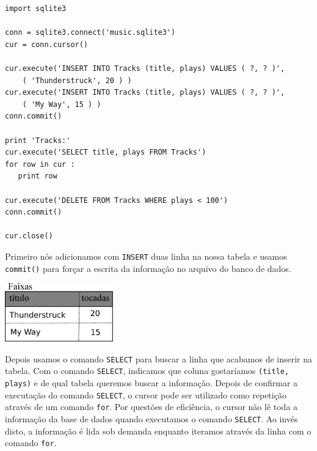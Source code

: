 \beforeverb
\begin{verbatim}
import sqlite3

conn = sqlite3.connect('music.sqlite3')
cur = conn.cursor()

cur.execute('INSERT INTO Tracks (title, plays) VALUES ( ?, ? )', 
    ( 'Thunderstruck', 20 ) )
cur.execute('INSERT INTO Tracks (title, plays) VALUES ( ?, ? )', 
    ( 'My Way', 15 ) )
conn.commit()

print 'Tracks:'
cur.execute('SELECT title, plays FROM Tracks')
for row in cur :
   print row

cur.execute('DELETE FROM Tracks WHERE plays < 100')
conn.commit()

cur.close()
\end{verbatim}
\afterverb
%

Primeiro nós adicionamos com {\tt INSERT} duas linha na nossa tabela e
usamos {\tt commit()} para forçar a escrita da informação no arquivo do banco
de dados.

\beforefig
\centerline{\includegraphics[height=1.00in]{figs2/tracks.eps}}
\afterfig


Depois usamos o comando {\tt SELECT} para buscar a linha que acabamos de
inserir na tabela. Com o comando {\tt SELECT}, indicamos que coluna gostaríamos
{\tt (title, plays)} e de qual tabela queremos buscar a informação. Depois
de confirmar a executação do comando {\tt SELECT}, o cursor pode ser utilizado
como repetição através de um comando {\tt for}. Por questões de eficiência, o
cursor não lê toda a informação da base de dados quando executamos o comando
{\tt SELECT}. Ao invés disto, a informação é lida sob demanda enquanto
iteramos através da linha com o comando {\tt for}.

